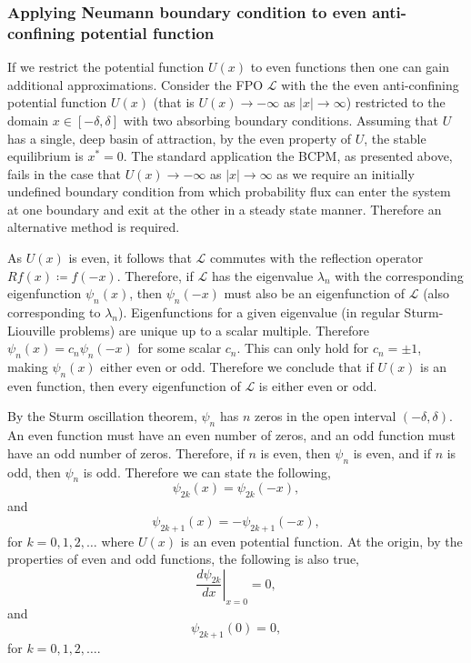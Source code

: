 \documentclass[11pt]{amsart}
\begin{document}
\subsubsection*{Applying Neumann boundary condition to even anti-confining potential function}
If we restrict the potential function $U(x)$ to even functions then one can gain additional approximations. Consider the FPO $\mathcal{L}$ with the the even anti-confining potential function $U(x)$ (that is $U(x) \to -\infty$ as $|x|\to \infty$) restricted to the domain $x\in[-\delta,\delta]$ with two absorbing boundary conditions. Assuming that $U$ has a single, deep basin of attraction, by the even property of $U$, the stable equilibrium is $x^*=0$. The standard application the BCPM, as presented above, fails in the case that $U(x) \to -\infty$ as $|x|\to \infty$ as we require an initially undefined boundary condition from which probability flux can enter the system at one boundary and exit at the other in a steady state manner. Therefore an alternative method is required.

As $U(x)$ is even, it follows that $\mathcal{L}$ commutes with the reflection operator $Rf(x) \coloneq f(-x)$. Therefore, if $\mathcal{L}$ has the eigenvalue $\lambda_n$ with the corresponding eigenfunction $\psi_n(x)$, then $\psi_n(-x)$ must also be an eigenfunction of $\mathcal{L}$ (also corresponding to $\lambda_n$). Eigenfunctions for a given eigenvalue (in regular Sturm-Liouville problems) are unique up to a scalar multiple. Therefore $\psi_n(x)=c_n\psi_n(-x)$ for some scalar $c_n$. This can only hold for $c_n = \pm1$, making $\psi_n(x)$ either even or odd. Therefore we conclude that if $U(x)$ is an even function, then every eigenfunction of $\mathcal{L}$ is either even or odd.

By the Sturm oscillation theorem, $\psi_n$ has $n$ zeros in the open interval $(-\delta, \delta)$. An even function must have an even number of zeros, and an odd function must have an odd number of zeros. Therefore, if $n$ is even, then $\psi_n$ is even, and if $n$ is odd, then $\psi_n$ is odd. Therefore we can state the following,
\begin{equation}
    \label{eq:evenness of even eigenfunction}
    \psi_{2k}(x) = \psi_{2k}(-x),
\end{equation}
and
\begin{equation}
    \label{eq:oddness of odd eigenfunction}
    \psi_{2k+1}(x) = -\psi_{2k+1}(-x),
\end{equation}
for $k = 0, 1,2,\dots$ where $U(x)$ is an even potential function. At the origin, by the properties of even and odd functions, the following is also true,
\begin{equation}
    \label{eq:even function origin condition}
    \left.\frac{d\psi_{2k}}{dx}\right|_{x=0} = 0,
\end{equation}
and
\begin{equation}
    \label{eq:odd function origin condition}
    \psi_{2k+1}(0) = 0,
\end{equation}
for $k=0,1,2,\dots$.
\end{document}
